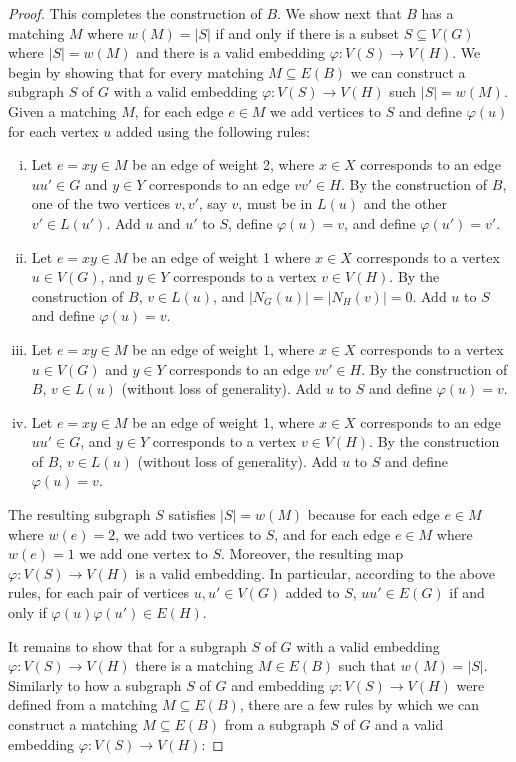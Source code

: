 \documentclass[11pt]{article}
\let\phi=\varphi
\begin{document}
\begin{proof}
This completes the construction of $B$.  We show next that $B$ has a matching $M$ where $w(M) = |S|$ if and only if there is a subset $S \subseteq V(G)$ where $|S| = w(M)$ and there is a valid embedding $\phi : V(S) \to V(H)$.  We begin by showing that for every matching $M \subseteq E(B)$ we can construct a subgraph $S$ of $G$ with a valid embedding $\phi: V(S) \to V(H)$ such $|S| = w(M)$.  Given a matching $M$, for each edge $e \in M$ we add vertices to $S$ and define $\phi(u)$ for each vertex $u$ added using the following rules:

\begin{enumerate}[(i)]
  \item Let $e=xy \in M$ be an edge of weight 2, where $x \in X$ corresponds to an edge $uu' \in G$ and $y\in Y$ corresponds to an edge $vv' \in H$. By the construction of $B$, one of the two vertices $v, v'$, say $v$, must be in $L(u)$ and the other $v' \in L(u')$.  Add $u$ and $u'$ to $S$, define $\phi(u) = v$, and define $\phi(u') = v'$.
  \item Let $e=xy \in M$ be an edge of weight 1 where $x \in X$ corresponds to a vertex $u \in V(G)$, and $y \in Y$ corresponds to a vertex $v \in V(H)$.  By the construction of $B$, $v \in L(u)$, and $|N_G(u)| = |N_H(v)| =0$.  Add $u$ to $S$ and define $\phi(u) = v$.
  \item Let $e=xy \in M$ be an edge of weight 1, where $x \in X$ corresponds to a vertex $u \in V(G)$ and $y \in Y$ corresponds to an edge $vv' \in H$. By the construction of $B$, $v \in L(u)$ (without loss of generality).  Add $u$ to $S$ and define $\phi(u) = v$.
  \item Let $e=xy \in M$ be an edge of weight 1, where $x \in X$ corresponds to an edge $uu' \in G$, and $y \in Y$ corresponds to a vertex $v \in V(H)$.  By the construction of $B$, $v \in L(u)$ (without loss of generality).  Add $u$ to $S$ and define $\phi(u) = v$.
\end{enumerate}

The resulting subgraph $S$ satisfies $|S| = w(M)$ because for each edge $e \in M$ where $w(e) = 2$, we add two vertices to $S$, and for each edge $e \in M$ where $w(e) = 1$ we add one vertex to $S$. Moreover, the resulting map $\phi: V(S) \to V(H)$ is a valid embedding. In particular, according to the above rules, for each pair of vertices $u,u' \in V(G)$ added to $S$, $uu' \in E(G)$ if and only if $\phi(u)\phi(u') \in E(H)$.

It remains to show that for a subgraph $S$ of $G$ with a valid embedding $\phi : V(S) \to V(H)$ there is a matching $M \in E(B)$ such that $w(M) = |S|$.  Similarly to how a subgraph $S$ of $G$ and embedding $\phi : V(S) \to V(H)$ were defined from a matching $M \subseteq E(B)$, there are a few rules by which we can construct a matching $M \subseteq E(B)$ from a subgraph $S$ of $G$ and a valid embedding $\phi : V(S) \to V(H)$:


\end{proof}
\end{document}
